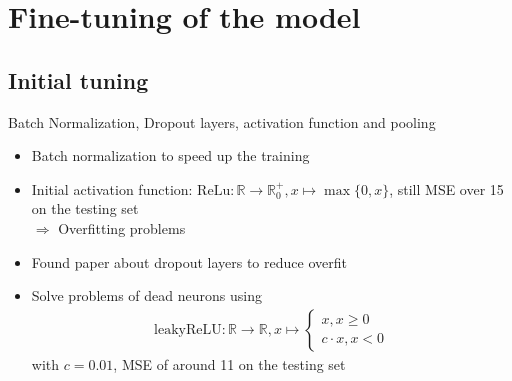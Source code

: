 \section{Fine-tuning of the model}
\subsection{Initial tuning}

\begin{frame}{Batch Normalization, Dropout layers, activation function and pooling}
\begin{itemize}
\item Batch normalization to speed up the training \cite{BatchNorm2015}
\item Initial activation function: $\mathrm{ReLu}: \mathbb{R} \to \mathbb{R}_0^+, x \mapsto \max\{0,x\}$, still MSE over 15 on the testing set\\
$\Rightarrow$ Overfitting problems
\item Found paper about dropout layers \cite{Dropout2014} to reduce overfit
\item Solve problems of dead neurons using
\begin{align*}
\mathrm{leakyReLU} : \mathbb{R} \to \mathbb{R}, x \mapsto \begin{cases}
x, x \geq 0\\
c \cdot x, x <0
\end{cases}
\end{align*}
with $c = 0.01$, MSE of around 11 on the testing set
\end{itemize}
\end{frame}
